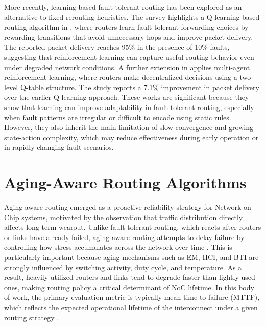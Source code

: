 More recently, learning-based fault-tolerant routing has been explored as an alternative to fixed rerouting heuristics. The survey highlights a Q-learning-based routing algorithm in \cite{Samala2020}, where routers learn fault-tolerant forwarding choices by rewarding transitions that avoid unnecessary hops and improve packet delivery. The reported packet delivery reaches 95\% in the presence of 10\% faults, suggesting that reinforcement learning can capture useful routing behavior even under degraded network conditions. A further extension in \cite{Samala2022} applies multi-agent reinforcement learning, where routers make decentralized decisions using a two-level Q-table structure. The study reports a 7.1\% improvement in packet delivery over the earlier Q-learning approach. These works are significant because they show that learning can improve adaptability in fault-tolerant routing, especially when fault patterns are irregular or difficult to encode using static rules. However, they also inherit the main limitation of slow convergence and growing state-action complexity, which may reduce effectiveness during early operation or in rapidly changing fault scenarios.

\section{Aging-Aware Routing Algorithms}

Aging-aware routing emerged as a proactive reliability strategy for Network-on-Chip systems, motivated by the observation that traffic distribution directly affects long-term wearout. Unlike fault-tolerant routing, which reacts after routers or links have already failed, aging-aware routing attempts to delay failure by controlling how stress accumulates across the network over time \cite{Kondoth2026}. This is particularly important because aging mechanisms such as EM, HCI, and BTI are strongly influenced by switching activity, duty cycle, and temperature. As a result, heavily utilized routers and links tend to degrade faster than lightly used ones, making routing policy a critical determinant of NoC lifetime. In this body of work, the primary evaluation metric is typically mean time to failure (MTTF), which reflects the expected operational lifetime of the interconnect under a given routing strategy \cite{Kondoth2026}.

